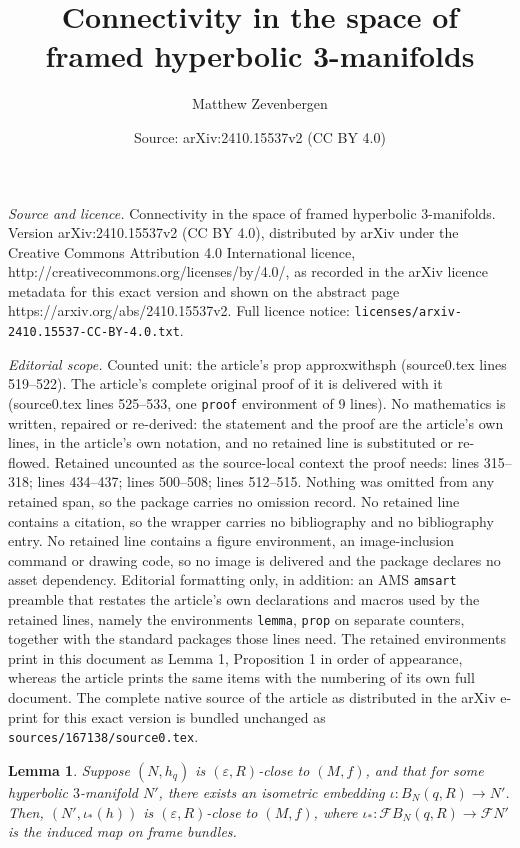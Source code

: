 \documentclass[10pt,a4paper]{amsart}
\title{Connectivity in the space of framed hyperbolic 3-manifolds}
\author{Matthew Zevenbergen}
\date{Source: arXiv:2410.15537v2 (CC BY 4.0)}
\newtheorem{lemma}{Lemma}
\begin{document}
\maketitle

\noindent\emph{Source and licence.} Connectivity in the space of framed hyperbolic 3-manifolds. Version arXiv:2410.15537v2 (CC BY 4.0), distributed by arXiv under the Creative Commons Attribution 4.0 International licence, http://creativecommons.org/licenses/by/4.0/, as recorded in the arXiv licence metadata for this exact version and shown on the abstract page https://arxiv.org/abs/2410.15537v2. Full licence notice: \texttt{licenses/arxiv-2410.15537-CC-BY-4.0.txt}.\par\smallskip

\noindent\textit{Editorial scope.} Counted unit: the article's prop approxwithsph (source0.tex lines 519--522). The article's complete original proof of it is delivered with it (source0.tex lines 525--533, one \texttt{proof} environment of 9 lines). No mathematics is written, repaired or re-derived: the statement and the proof are the article's own lines, in the article's own notation, and no retained line is substituted or re-flowed.  Retained uncounted as the source-local context the proof needs: lines 315--318; lines 434--437; lines 500--508; lines 512--515.  Nothing was omitted from any retained span, so the package carries no omission record.  No retained line contains a citation, so the wrapper carries no bibliography and no bibliography entry.  No retained line contains a figure environment, an image-inclusion command or drawing code, so no image is delivered and the package declares no asset dependency.  Editorial formatting only, in addition: an AMS \texttt{amsart} preamble that restates the article's own declarations and macros used by the retained lines, namely the environments \texttt{lemma}, \texttt{prop} on separate counters, together with the standard packages those lines need.  The retained environments print in this document as Lemma 1, Proposition 1 in order of appearance, whereas the article prints the same items with the numbering of its own full document.  The complete native source of the article as distributed in the arXiv e-print for this exact version is bundled unchanged as \texttt{sources/167138/source0.tex}.
\begin{lemma}
    \label{lemma-eRTransitivity}
    Suppose $(N,h_q)$ is $(\varepsilon,R)$-close to $(M,f)$, and that for some hyperbolic $3$-manifold $N'$, there exists an isometric embedding $\iota: B_N(q,R)\rightarrow N'$. Then, $(N',\iota_*(h))$ is $(\varepsilon,R)$-close to $(M,f)$, where $\iota_*:\mathcal{F}B_N(q,R)\rightarrow\mathcal{F}N'$ is the induced map on frame bundles.
\end{lemma}
\end{document}
